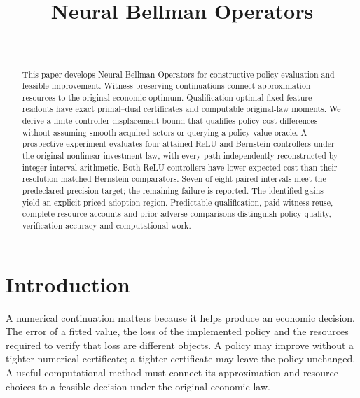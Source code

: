 \documentclass[ecta,nameyear,draft]{econsocart}
\begin{document}
\begin{frontmatter}
\title{Neural Bellman Operators}
\begin{aug}
\author[id=au1,addressref={add1}]{~}
\address[id=add1]{Peking University}
\end{aug}
\begin{abstract}
This paper develops Neural Bellman Operators for constructive policy evaluation and feasible improvement. Witness-preserving continuations connect approximation resources to the original economic optimum. Qualification-optimal fixed-feature readouts have exact primal--dual certificates and computable original-law moments. We derive a finite-controller displacement bound that qualifies policy-cost differences without assuming smooth acquired actors or querying a policy-value oracle. A prospective experiment evaluates four attained ReLU and Bernstein controllers under the original nonlinear investment law, with every path independently reconstructed by integer interval arithmetic. Both ReLU controllers have lower expected cost than their resolution-matched Bernstein comparators. Seven of eight paired intervals meet the predeclared precision target; the remaining failure is reported. The identified gains yield an explicit priced-adoption region. Predictable qualification, paid witness reuse, complete resource accounts and prior adverse comparisons distinguish policy quality, verification accuracy and computational work.
\end{abstract}
\begin{keyword}
\end{keyword}
\end{frontmatter}
\section{Introduction}\label{sec:introduction65}
A numerical continuation matters because it helps produce an economic decision. The error of a fitted value, the loss of the implemented policy and the resources required to verify that loss are different objects. A policy may improve without a tighter numerical certificate; a tighter certificate may leave the policy unchanged. A useful computational method must connect its approximation and resource choices to a feasible decision under the original economic law.
\end{document}
